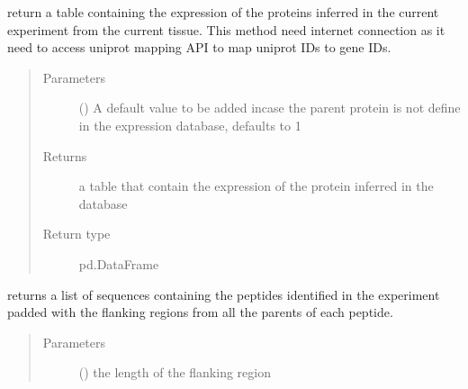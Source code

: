 \documentclass[letterpaper,10pt,english]{sphinxmanual}
\begin{document}
\begin{fulllineitems}
\begin{fulllineitems}
\label{\detokenize{IPTK.Classes:IPTK.Classes.Experiment.Experiment.get_expression_of_parent_proteins}}
return a table containing the expression of the proteins inferred in the current experiment from the current tissue.
This method need internet connection as it need to access uniprot mapping API to map uniprot IDs to gene IDs.
\begin{quote}\begin{description}
\item[{Parameters}] \leavevmode
{} (\sphinxstyleliteralemphasis{\sphinxupquote{, }}) \textendash{} A default value to be added incase the parent protein is not define in the expression database, defaults to \sphinxhyphen{}1

\item[{Returns}] \leavevmode
a table that contain the expression of the protein inferred in the database

\item[{Return type}] \leavevmode
pd.DataFrame

\end{description}\end{quote}

\end{fulllineitems}


\begin{fulllineitems}
\label{\detokenize{IPTK.Classes:IPTK.Classes.Experiment.Experiment.get_flanked_peptides}}
returns a list of sequences containing the peptides identified in the experiment padded with
the flanking regions from all the parents of each peptide.
\begin{quote}\begin{description}
\item[{Parameters}] \leavevmode
{} () \textendash{} the length of the flanking region


\end{description}
\end{quote}
\end{fulllineitems}
\end{fulllineitems}
\end{document}
